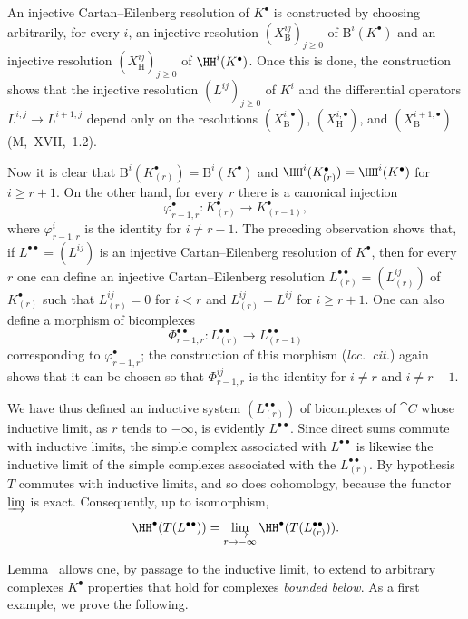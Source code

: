 An injective Cartan--Eilenberg resolution of $K^\bullet$ is constructed by choosing arbitrarily, for every $i$, an injective resolution $(X_{\mathrm{B}}^{ij})_{j\geq 0}$ of $\mathrm{B}^i(K^\bullet)$ and an injective resolution $(X_{\mathrm{H}}^{ij})_{j\geq 0}$ of $\HH^i(K^\bullet)$.
Once this is done, the construction shows that the injective resolution $(L^{ij})_{j\geq 0}$ of $K^i$ and the differential operators $L^{i,j}\to L^{i+1,j}$ depend only on the resolutions $(X_{\mathrm{B}}^{i,\bullet})$, $(X_{\mathrm{H}}^{i,\bullet})$, and $(X_{\mathrm{B}}^{i+1,\bullet})$ (M,~XVII,~1.2).

Now it is clear that $\mathrm{B}^i(K^\bullet_{(r)})=\mathrm{B}^i(K^\bullet)$ and $\HH^i(K^\bullet_{(r)})=\HH^i(K^\bullet)$ for $i\geq r+1$.
On the other hand, for every $r$ there is a canonical injection
\[
  \varphi^\bullet_{r-1,r}:K^\bullet_{(r)}\longrightarrow K^\bullet_{(r-1)},
\]
where $\varphi^i_{r-1,r}$ is the identity for $i\neq r-1$.
The preceding observation shows that, if $L^{\bullet\bullet}=(L^{ij})$ is an injective Cartan--Eilenberg resolution of $K^\bullet$, then for every $r$ one can define an injective Cartan--Eilenberg resolution $L^{\bullet\bullet}_{(r)}=(L^{ij}_{(r)})$ of $K^\bullet_{(r)}$ such that $L^{ij}_{(r)}=0$ for $i<r$ and $L^{ij}_{(r)}=L^{ij}$ for $i\geq r+1$.
One can also define a morphism of bicomplexes
\[
  \Phi^{\bullet\bullet}_{r-1,r}:L^{\bullet\bullet}_{(r)}
  \longrightarrow L^{\bullet\bullet}_{(r-1)}
\]
corresponding to $\varphi^\bullet_{r-1,r}$; the construction of this morphism (\emph{loc.\ cit.}) again shows that it can be chosen so that $\Phi^{ij}_{r-1,r}$ is the identity for $i\neq r$ and $i\neq r-1$.

We have thus defined an inductive system $(L^{\bullet\bullet}_{(r)})$ of bicomplexes of $\cat{C}$ whose inductive limit, as $r$ tends to $-\infty$, is evidently $L^{\bullet\bullet}$.
Since direct sums commute with inductive limits, the simple complex associated with $L^{\bullet\bullet}$ is likewise the inductive limit of the simple complexes associated with the $L^{\bullet\bullet}_{(r)}$.
By hypothesis $T$ commutes with inductive limits, and so does cohomology, because the functor $\varinjlim$ is exact.
Consequently, up to isomorphism,
\[
  \HH^\bullet(T(L^{\bullet\bullet}))
  =\varinjlim_{r\to-\infty}\HH^\bullet(T(L^{\bullet\bullet}_{(r)})).
\]

Lemma~ allows one, by passage to the inductive limit, to extend to arbitrary complexes $K^\bullet$ properties that hold for complexes \emph{bounded below}.
As a first example, we prove the following.

